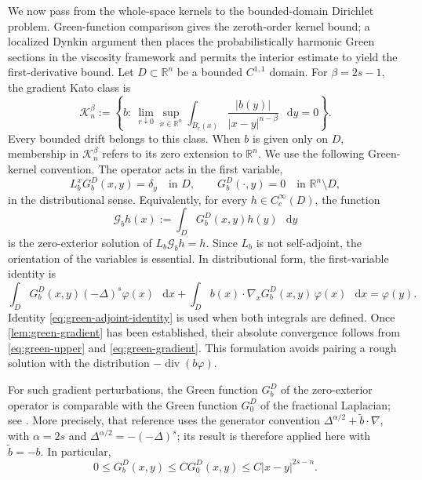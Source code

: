 \documentclass[10pt,a4paper]{amsart}
\numberwithin{equation}{section}
\newcommand{\R}{\mathbb R}
\newcommand{\differential}{\mathop{}\!\mathrm d}
\DeclareMathOperator{\divergence}{div}
\newcommand{\Lb}{L_b}
\newcommand{\rev}[1]{#1}
\begin{document}
\rev{We now pass from the whole-space kernels to the bounded-domain
Dirichlet problem.  Green-function comparison gives the zeroth-order
kernel bound; a localized Dynkin argument then places the probabilistically
harmonic Green sections in the viscosity framework and permits the interior
estimate to yield the first-derivative bound.}  Let $D\subset\R^n$ be a
bounded $C^{1,1}$ domain.  For $\beta=2s-1$, the gradient Kato class is
\begin{equation}\label{eq:kato-measure-section}
 \mathcal K_n^{\beta}
 :=\left\{b:\ \lim_{r\downarrow0}\sup_{x\in\R^n}
 \int_{B_r(x)}\frac{|b(y)|}{|x-y|^{n-\beta}}\,\differential y=0\right\}.
\end{equation}
Every bounded drift belongs to this class.  When $b$ is given only on $D$,
membership in $\mathcal K_n^\beta$ refers to its zero extension to $\R^n$.
We use the following Green-kernel convention.  The operator acts in the
first variable,
\[
 \Lb^xG_b^D(x,y)=\delta_y\quad\text{in }D,
 \qquad G_b^D(\cdot,y)=0\quad\text{in }\R^n\setminus D,
\]
in the distributional sense.  Equivalently, for every
$h\in C_c^\infty(D)$, the function
\[
 \mathcal G_bh(x):=\int_DG_b^D(x,y)h(y)\,\differential y
\]
is the zero-exterior solution of $\Lb\mathcal G_bh=h$.  Since $\Lb$ is not
self-adjoint, the orientation of the variables is essential.  In
distributional form, the first-variable identity is
\begin{equation}\label{eq:green-adjoint-identity}
 \int_D G_b^D(x,y)(-\Delta)^s\varphi(x)\,\differential x
 +\int_D b(x)\cdot\nabla_xG_b^D(x,y)\,\varphi(x)\,\differential x
 =\varphi(y).
\end{equation}
\rev{Identity \eqref{eq:green-adjoint-identity} is used when both integrals
are defined.  Once \cref{lem:green-gradient} has been established, their
absolute convergence follows from \eqref{eq:green-upper} and
\eqref{eq:green-gradient}.}  This
formulation avoids pairing a rough solution with the distribution
$-\divergence(b\varphi)$.

For such gradient perturbations,
the Green function $G_b^D$ of the zero-exterior operator is comparable with
the Green function $G_0^D$ of the fractional Laplacian; see
\cite{BogdanJakubowski2012}.  \rev{More precisely, that reference uses the
generator convention $\Delta^{\alpha/2}+\widetilde b\cdot\nabla$, with
$\alpha=2s$ and $\Delta^{\alpha/2}=-(-\Delta)^s$; its result is therefore
applied here with $\widetilde b=-b$.}  In particular,
\begin{equation}\label{eq:green-upper}
 0\le G_b^D(x,y)\le C G_0^D(x,y)
 \le C|x-y|^{2s-n}.
\end{equation}
\end{document}
